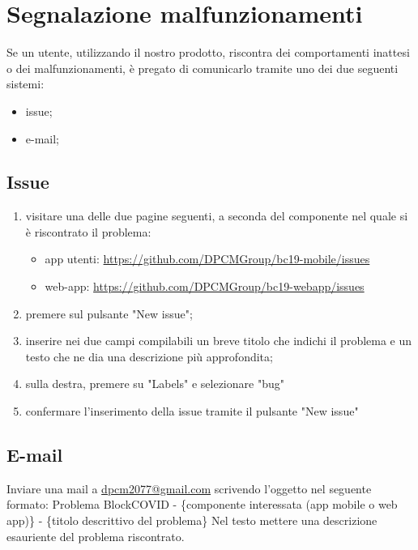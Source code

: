 \section{Segnalazione malfunzionamenti}
Se un utente, utilizzando il nostro prodotto, riscontra dei comportamenti inattesi o dei malfunzionamenti, è pregato di comunicarlo tramite uno dei due seguenti sistemi:
\begin{itemize}
	\item issue;
	\item e-mail;
\end{itemize}
\subsection{Issue}
\begin{enumerate}
	\item visitare una delle due pagine seguenti, a seconda del componente nel quale si è riscontrato il problema:
	\begin{itemize}
		\item app utenti: \url{https://github.com/DPCMGroup/bc19-mobile/issues}
		\item web-app: \url{https://github.com/DPCMGroup/bc19-webapp/issues}
	\end{itemize}
	\item premere sul pulsante "New issue";
	\item inserire nei due campi compilabili un breve titolo che indichi il problema e un testo che ne dia una descrizione più approfondita;
	\item sulla destra, premere su "Labels" e selezionare "bug"
	\item confermare l'inserimento della issue tramite il pulsante "New issue"
\end{enumerate}
\subsection{E-mail}
Inviare una mail a \href{mailto:dpcm2077@gmail.com}{dpcm2077@gmail.com} scrivendo l'oggetto nel seguente formato: \newline
Problema BlockCOVID - \{componente interessata (app mobile o web app)\} - \{titolo descrittivo del problema\} \newline
Nel testo mettere una descrizione esauriente del problema riscontrato.